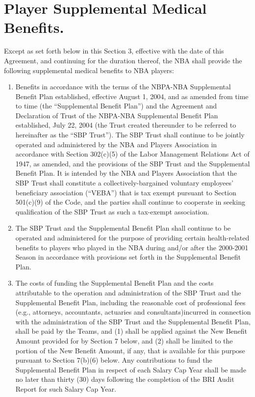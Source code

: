 \documentclass[
]{book}
\providecommand{\tightlist}{%
  \setlength{\itemsep}{0pt}\setlength{\parskip}{0pt}}
\begin{document}
\hypertarget{player-supplemental-medical-benefits.}{%
\section{Player Supplemental Medical Benefits.}\label{player-supplemental-medical-benefits.}}

Except as set forth below in this Section 3, effective with the date of this Agreement, and continuing for the duration thereof, the NBA shall provide the following supplemental medical benefits to NBA players:

\begin{enumerate}
\def\labelenumi{(\alph{enumi})}
\tightlist
\item
  Benefits in accordance with the terms of the NBPA-NBA Supplemental Benefit Plan established, effective August 1, 2004, and as amended from time to time (the ``Supplemental Benefit Plan'') and the Agreement and Declaration of Trust of the NBPA-NBA Supplemental Benefit Plan established, July 22, 2004 (the Trust created thereunder to be referred to hereinafter as the ``SBP Trust''). The SBP Trust shall continue to be jointly operated and administered by the NBA and Players Association in accordance with Section 302(c)(5) of the Labor Management Relations Act of 1947, as amended, and the provisions of the SBP Trust and the Supplemental Benefit Plan. It is intended by the NBA and Players Association that the SBP Trust shall constitute a collectively-bargained voluntary employees' beneficiary association (``VEBA'') that is tax exempt pursuant to Section 501(c)(9) of the Code, and the parties shall continue to cooperate in seeking qualification of the SBP Trust as such a tax-exempt association.
\item
  The SBP Trust and the Supplemental Benefit Plan shall continue to be operated and administered for the purpose of providing certain health-related benefits to players who played in the NBA during and/or after the 2000-2001 Season in accordance with provisions set forth in the Supplemental Benefit Plan.
\item
  The costs of funding the Supplemental Benefit Plan and the costs attributable to the operation and administration of the SBP Trust and the Supplemental Benefit Plan, including the reasonable cost of professional fees (e.g., attorneys, accountants, actuaries and consultants)incurred in connection with the administration of the SBP Trust and the Supplemental Benefit Plan, shall be paid by the Teams, and (1) shall be applied against the New Benefit Amount provided for by Section 7 below, and (2) shall be limited to the portion of the New Benefit Amount, if any, that is available for this purpose pursuant to Section 7(b)(6) below. Any contributions to fund the Supplemental Benefit Plan in respect of each Salary Cap Year shall be made no later than thirty (30) days following the completion of the BRI Audit Report for such Salary Cap Year.

\end{enumerate}
\end{document}
